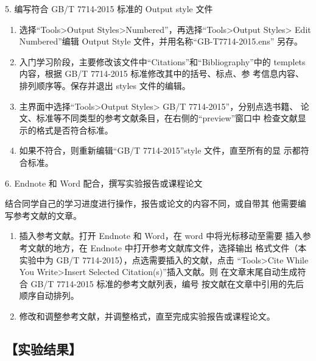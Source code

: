 \documentclass[12pt,a4paper,UTF8]{ctexart}
\begin{document}
	5. 编写符合 GB/T 7714-2015 标准的 Output style 文件
	
	\begin{enumerate}[(1)]
		\item 选择“Tools>Output Styles>Numbered”，再选择“Tools>Output Styles> Edit
		Numbered”编辑 Output Style 文件，并用名称“GB-T7714-2015.ens”
		另存。
		\item 入门学习阶段，主要修改该文件中“Citations”和“Bibliography”中的
		templets 内容，根据 GB/T 7714-2015 标准修改其中的括号、标点、参
		考信息内容、排列顺序等。保存并退出 styles 文件的编辑。
		\item 主界面中选择“Tools>Output Styles> GB/T 7714-2015”，分别点选书籍、
		论文、标准等不同类型的参考文献条目，在右侧的“preview”窗口中
		检查文献显示的格式是否符合标准。
		\item 如果不符合，则重新编辑“GB/T 7714-2015”style 文件，直至所有的显
		示都符合标准。
	\end{enumerate}

	6. Endnote 和 Word 配合，撰写实验报告或课程论文

	结合同学自己的学习进度进行操作，报告或论文的内容不同，或自带其
	他需要编写参考文献的文章。

	\begin{enumerate}[(1)]
		\item 插入参考文献。打开 Endnote 和 Word，在 word 中将光标移动至需要
		插入参考文献的地方，在 Endnote 中打开参考文献库文件，选择输出
		格式文件（本实验中为 GB/T 7714-2015），点选需要插入的文献，点击
		“Tools>Cite While You Write>Insert Selected Citation(s)”插入文献。则
		在文章末尾自动生成符合 GB/T 7714-2015 标准的参考文献列表，编号
		按文献在文章中引用的先后顺序自动排列。
		\item 修改和调整参考文献，并调整格式，直至完成实验报告或课程论文。
	\end{enumerate}

\subsection*{【实验结果】}
\end{document}
